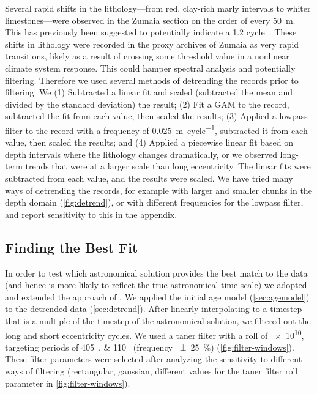 \documentclass[draft]{agujournal2019}
\newcommand{\rez}{\textcolor{magenta}}
\newcommand{\ijk}{\textcolor{blue}}
\begin{document}
Several rapid shifts in the lithology---from red, clay-rich marly intervals to whiter limestones---were observed in the Zumaia section on the order of every \qty{50}{\metre}.
This has previously been suggested to potentially indicate a \qty{1.2}{\millionyear} cycle~\cite{Batenburg2014}.
These shifts in lithology were recorded in the proxy archives of Zumaia as very rapid transitions, likely as a result of crossing some threshold value in a nonlinear climate system response.
This could hamper spectral analysis and potentially filtering.
Therefore we used several methods of detrending the records prior to filtering: We
(1) Subtracted a linear fit and scaled (subtracted the mean and divided by the standard deviation) the result;
(2) Fit a \gls{GAM} to the record, subtracted the fit from each value, then scaled the results;
(3) Applied a lowpass filter to the record with a frequency of \qty{0.025}{\metre\per cycle}, subtracted it from each value, then scaled the results;
and (4) Applied a piecewise linear fit based on depth intervals where the lithology changes dramatically, or we observed long-term trends that were at a larger scale than long eccentricity.
The linear fits were subtracted from each value, and the results were scaled.
We have tried many ways of detrending the records, for example with larger and smaller chunks in the depth domain (\cref{fig:detrend}), or with different frequencies for the lowpass filter, and report sensitivity to this in the appendix.


\subsection{Finding the Best Fit}\label{sec:algorithm}

In order to test which astronomical solution provides the best match to the data
(and hence is more likely to reflect the true astronomical time scale)
we adopted and extended the approach of .
We applied the initial age model (\cref{sec:agemodel}) to the detrended data (\cref{sec:detrend}).
After linearly interpolating to a timestep that is a multiple of the timestep of the astronomical solution,
we filtered out the long and short eccentricity cycles.
We used a taner filter with a roll of \num{e10}, targeting periods of \qtylist{405;110}{\kiloyear} (frequency \qty{\pm25}{\percent}) (\cref{fig:filter-windows}).
These filter parameters were selected after analyzing the sensitivity to different ways of filtering (rectangular, gaussian, different values for the taner filter roll parameter in \cref{fig:filter-windows}).
\end{document}

